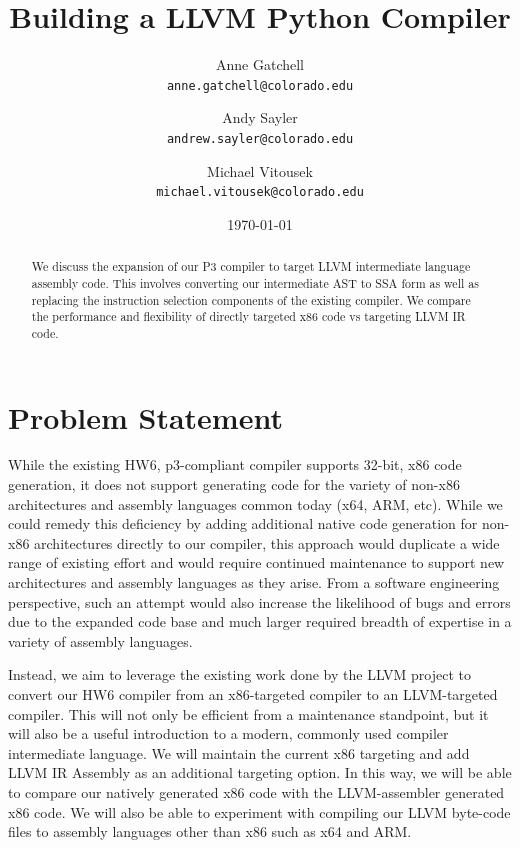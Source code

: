 \documentclass[11pt,twocolumn]{article}
\begin{document}
\title{
  Building a LLVM Python Compiler
}

\author{
  Anne Gatchell    \\ \texttt{anne.gatchell@colorado.edu} \and
  Andy Sayler      \\ \texttt{andrew.sayler@colorado.edu} \and
  Michael Vitousek \\ \texttt{michael.vitousek@colorado.edu}
}

\date{\today}

\maketitle

\begin{abstract}

We discuss the expansion of our P3 compiler to target LLVM intermediate
language assembly code. This involves converting our intermediate
AST to SSA form as well as replacing the instruction selection
components of the existing compiler. We compare the performance and
flexibility of directly targeted x86 code vs targeting LLVM IR code.

\end{abstract}

\section{Problem Statement}

While the existing HW6, p3-compliant compiler supports 32-bit, x86
code generation, it does not support generating code for the variety
of non-x86 architectures and assembly languages common today (x64,
ARM, etc). While we could remedy this deficiency by adding additional
native code generation for non-x86 architectures directly to our
compiler, this approach would duplicate a wide range of existing
effort and would require continued maintenance to support new
architectures and assembly languages as they arise. From a software
engineering perspective, such an attempt would also increase the
likelihood of bugs and errors due to the expanded code base and much
larger required breadth of expertise in a variety of assembly
languages.

Instead, we aim to leverage the existing work done by the LLVM project
\cite{llvm.org} to convert our HW6 compiler from an x86-targeted
compiler to an LLVM-targeted compiler. This will not only be efficient
from a maintenance standpoint, but it will also be a useful
introduction to a modern, commonly used compiler intermediate
language. We will maintain the current x86 targeting and add LLVM IR
Assembly \cite{lattner-llvmlangref} as an additional targeting
option. In this way, we will be able to compare our natively generated
x86 code with the LLVM-assembler generated x86 code. We will also be
able to experiment with compiling our LLVM byte-code files to assembly
languages other than x86 such as x64 and ARM.
\end{document}
